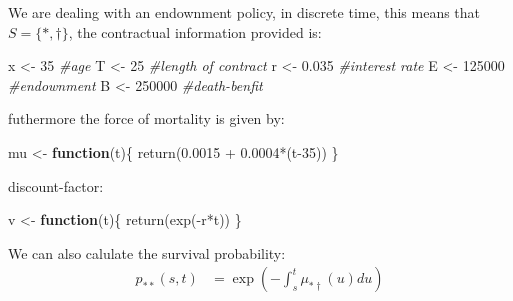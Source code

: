 \documentclass[
]{article}
\newenvironment{Shaded}{\begin{snugshade}}{\end{snugshade}}
\newcommand{\CommentTok}[1]{\textcolor[rgb]{0.56,0.35,0.01}{\textit{#1}}}
\newcommand{\ControlFlowTok}[1]{\textcolor[rgb]{0.13,0.29,0.53}{\textbf{#1}}}
\newcommand{\DecValTok}[1]{\textcolor[rgb]{0.00,0.00,0.81}{#1}}
\newcommand{\FloatTok}[1]{\textcolor[rgb]{0.00,0.00,0.81}{#1}}
\newcommand{\FunctionTok}[1]{\textcolor[rgb]{0.00,0.00,0.00}{#1}}
\newcommand{\NormalTok}[1]{#1}
\newcommand{\OtherTok}[1]{\textcolor[rgb]{0.56,0.35,0.01}{#1}}
\newcommand{\SpecialCharTok}[1]{\textcolor[rgb]{0.00,0.00,0.00}{#1}}
\begin{document}
We are dealing with an endownment policy, in discrete time, this means
that \(S = \{*, \dagger\}\), the contractual information provided is:

\begin{Shaded}
\begin{Highlighting}[]
\NormalTok{x }\OtherTok{\textless{}{-}} \DecValTok{35}     \CommentTok{\#age}
\NormalTok{T }\OtherTok{\textless{}{-}} \DecValTok{25}     \CommentTok{\#length of contract}
\NormalTok{r }\OtherTok{\textless{}{-}} \FloatTok{0.035}  \CommentTok{\#interest rate }
\NormalTok{E }\OtherTok{\textless{}{-}} \DecValTok{125000} \CommentTok{\#endownment }
\NormalTok{B }\OtherTok{\textless{}{-}} \DecValTok{250000} \CommentTok{\#death{-}benfit}
\end{Highlighting}
\end{Shaded}

futhermore the force of mortality is given by:

\begin{Shaded}
\begin{Highlighting}[]
\NormalTok{mu }\OtherTok{\textless{}{-}} \ControlFlowTok{function}\NormalTok{(t)\{}
  \FunctionTok{return}\NormalTok{(}\FloatTok{0.0015} \SpecialCharTok{+} \FloatTok{0.0004}\SpecialCharTok{*}\NormalTok{(t}\DecValTok{{-}35}\NormalTok{))}
\NormalTok{\}}
\end{Highlighting}
\end{Shaded}

discount-factor:

\begin{Shaded}
\begin{Highlighting}[]
\NormalTok{v }\OtherTok{\textless{}{-}} \ControlFlowTok{function}\NormalTok{(t)\{}
  \FunctionTok{return}\NormalTok{(}\FunctionTok{exp}\NormalTok{(}\SpecialCharTok{{-}}\NormalTok{r}\SpecialCharTok{*}\NormalTok{t))}
\NormalTok{\}}
\end{Highlighting}
\end{Shaded}

We can also calulate the survival probability: \[\begin{aligned}
p_{**}(s,t) &= \exp\left(-\int_{s}^{t}\mu_{*\dagger}(u)du\right)
\end{aligned}\]
\end{document}
